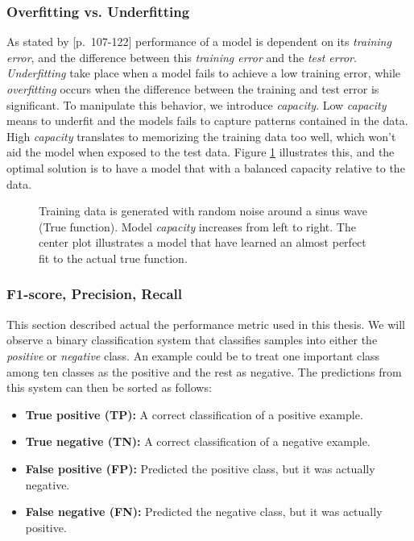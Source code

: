     \subsubsection{Overfitting vs. Underfitting}
        As stated by \citeauthor{Goodfellow-et-al-2016}\cite{Goodfellow-et-al-2016}[p.~107-122] performance of a model is dependent on its \textit{training error}, and the difference between this \textit{training error} and the \textit{test error}. \textit{Underfitting} take place when a model fails to achieve a low training error, while \textit{overfitting} occurs when the difference between the training and test error is significant. To manipulate this behavior, we introduce \textit{capacity}. Low \textit{capacity} means to underfit and the models fails to capture patterns contained in the data. High \textit{capacity} translates to memorizing the training data too well, which won't aid the model when exposed to the test data. Figure \ref{over/under fit fig} illustrates this, and the optimal solution is to have a model that with a balanced capacity relative to the data. 
        
        \begin{figure}[H]
            \centering
            
            \caption[Over/under-fit]{Training data is generated with random noise around a sinus wave (True function). Model \textit{capacity} increases from left to right. The center plot illustrates a model that have learned an almost perfect fit to the actual true function.}
          	\medskip 
            \label{over/under fit fig}
        \end{figure}
        
    \subsubsection{F1-score, Precision, Recall} \label{f1_score}
        This section described actual the performance metric used in this thesis. We will observe a binary classification system that classifies samples into either the \textit{positive} or \textit{negative} class\cite{powers2020evaluation_f1_recall_precision}. An example could be to treat one important class among ten classes as the positive and the rest as negative. The predictions from this system can then be sorted as follows:
        
        \begin{itemize}
            \item \textbf{True positive (TP):} A correct classification of a positive example.
            \item \textbf{True negative (TN):} A correct classification of a negative example.
            \item \textbf{False positive (FP):} Predicted the positive class, but it was actually negative.
            \item \textbf{False negative (FN):} Predicted the negative class, but it was actually positive.
            \end{itemize}
        
